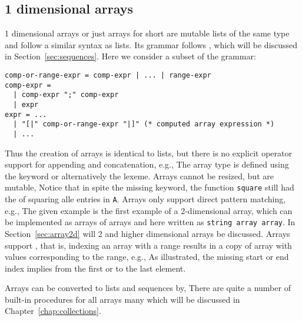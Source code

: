 \subsection{1 dimensional arrays}
1 dimensional arrays or just arrays for short are mutable lists of the same type and follow a similar syntax as lists. Its grammar follows , which will be discussed in Section~\ref{sec:sequences}. Here we consider a subset of the grammar:
%
\begin{lstlisting}[language=ebnf]
comp-or-range-expr = comp-expr | ... | range-expr
comp-expr =
  | comp-expr ";" comp-expr
  | expr
expr = ... 
  | "[|" comp-or-range-expr "|]" (* computed array expression *)
  | ...
\end{lstlisting}
%
Thus the creation of arrays is identical to lists, but there is no explicit operator support for appending and concatenation, e.g.,
%
%
The array type is defined using the  keyword or alternatively the \keyword{[]} lexeme. Arrays cannot be resized, but are mutable,
%
%
Notice that in spite the missing  keyword, the function \lstinline{square} still had the  of squaring alle entries in \lstinline{A}.  Arrays only support direct pattern matching, e.g.,
%
%
The given example is the first example of a 2-dimensional array, which can be implemented as arrays of arrays and here written as \lstinline!string array array!. In Section~\ref{sec:array2d} will 2 and higher dimensional arrays be discussed.  Arrays support , that is, indexing an array with a range results in a copy of array with values corresponding to the range, e.g.,
%
%
As illustrated, the missing start or end index implies from the first or to the last element.

Arrays can be converted to lists and sequences by,
%
%
There are quite a number of built-in procedures for all arrays many which will be discussed in Chapter~\ref{chap:collections}.

